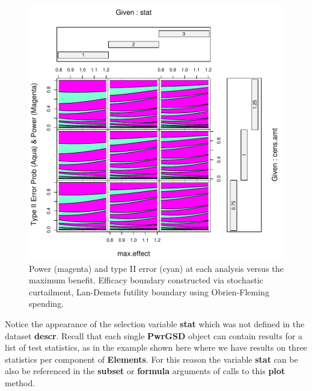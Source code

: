 \documentclass{article}
\begin{document}
\begin{figure}
\begin{center}
\includegraphics{cpd-PwrGSD-vignette-1-fig2-StochCurt}
\end{center}
\caption{Power (magenta) and type II error (cyan) at each analysis versus the
  maximum benefit. Efficacy boundary constructed via stochastic curtailment,
  Lan-Demets futility boundary using Obrien-Fleming spending.}
\label{fig:StochCurt}
\end{figure}

Notice the appearance of the selection variable {\bf stat} which was not defined
in the dataset {\bf descr}.  Recall that each single {\bf PwrGSD} object can
contain results for a list of test statistics, as in the example shown here
where we have results on three statistics per component of {\bf Elements}.
For this reason the variable {\bf stat} can be also be referenced in the
{\bf subset} or {\bf formula} arguments of calls to this {\bf plot} method.
\end{document}
